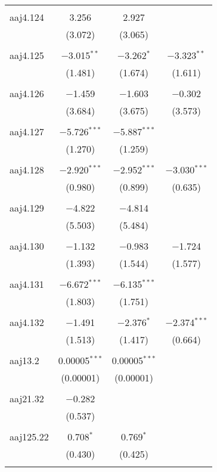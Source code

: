 \begin{table}[!htbp]
\begin{tabular}{@{\extracolsep{5pt}}lccc}
  & & & \\ 
 aaj4.124 & 3.256 & 2.927 &  \\ 
  & (3.072) & (3.065) &  \\ 
  & & & \\ 
 aaj4.125 & $-$3.015$^{**}$ & $-$3.262$^{*}$ & $-$3.323$^{**}$ \\ 
  & (1.481) & (1.674) & (1.611) \\ 
  & & & \\ 
 aaj4.126 & $-$1.459 & $-$1.603 & $-$0.302 \\ 
  & (3.684) & (3.675) & (3.573) \\ 
  & & & \\ 
 aaj4.127 & $-$5.726$^{***}$ & $-$5.887$^{***}$ &  \\ 
  & (1.270) & (1.259) &  \\ 
  & & & \\ 
 aaj4.128 & $-$2.920$^{***}$ & $-$2.952$^{***}$ & $-$3.030$^{***}$ \\ 
  & (0.980) & (0.899) & (0.635) \\ 
  & & & \\ 
 aaj4.129 & $-$4.822 & $-$4.814 &  \\ 
  & (5.503) & (5.484) &  \\ 
  & & & \\ 
 aaj4.130 & $-$1.132 & $-$0.983 & $-$1.724 \\ 
  & (1.393) & (1.544) & (1.577) \\ 
  & & & \\ 
 aaj4.131 & $-$6.672$^{***}$ & $-$6.135$^{***}$ &  \\ 
  & (1.803) & (1.751) &  \\ 
  & & & \\ 
 aaj4.132 & $-$1.491 & $-$2.376$^{*}$ & $-$2.374$^{***}$ \\ 
  & (1.513) & (1.417) & (0.664) \\ 
  & & & \\ 
 aaj13.2 & 0.00005$^{***}$ & 0.00005$^{***}$ &  \\ 
  & (0.00001) & (0.00001) &  \\ 
  & & & \\ 
 aaj21.32 & $-$0.282 &  &  \\ 
  & (0.537) &  &  \\ 
  & & & \\ 
 aaj125.22 & 0.708$^{*}$ & 0.769$^{*}$ &  \\ 
  & (0.430) & (0.425) &  \\ 
  & & & \\ 

\end{tabular}
\end{table}
